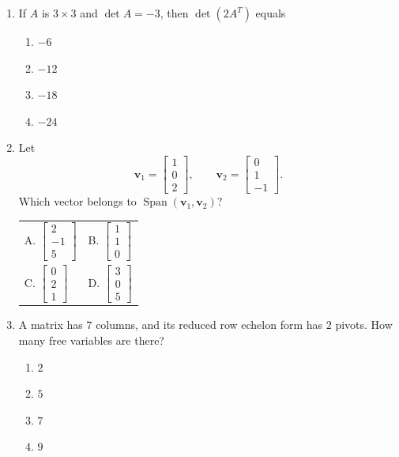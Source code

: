\documentclass[11pt]{article}
\newif\ifshowsolutions
\newcommand{\vect}[1]{\mathbf{#1}}
\newcommand{\mcneedspace}{\ifshowsolutions\Needspace{12\baselineskip}\fi}
\newcommand{\solution}[1]{%
  \ifshowsolutions
    \par\medskip
    {\color{solutionblue}\textbf{Solution.} #1}
    \par\medskip
  \fi}
\begin{document}
\begin{enumerate}
\mcneedspace
\item If $A$ is $3\times3$ and $\det A=-3$, then $\det(2A^T)$ equals
\begin{enumerate}[label=\Alph*.]
  \item $-6$
  \item $-12$
  \item $-18$
  \item $-24$
\end{enumerate}
\solution{\textbf{D.} $\det(2A^T)=2^3\det(A^T)=8\det A=-24$.}

\mcneedspace
\item Let
\[
\vect v_1=\begin{bmatrix}1\\0\\2\end{bmatrix},
\qquad
\vect v_2=\begin{bmatrix}0\\1\\-1\end{bmatrix}.
\]
Which vector belongs to $\operatorname{Span}(\vect v_1,\vect v_2)$?
\begin{center}
\begin{tabular}{@{}p{.45\linewidth}p{.45\linewidth}@{}}
A. $\begin{bmatrix}2\\-1\\5\end{bmatrix}$ &
B. $\begin{bmatrix}1\\1\\0\end{bmatrix}$ \\[1.5em]
C. $\begin{bmatrix}0\\2\\1\end{bmatrix}$ &
D. $\begin{bmatrix}3\\0\\5\end{bmatrix}$
\end{tabular}
\end{center}
\solution{\textbf{A.} The vector equals $2\vect v_1-\vect v_2$.}

\mcneedspace
\item A matrix has $7$ columns, and its reduced row echelon form has $2$ pivots. How many free variables are there?
\begin{enumerate}[label=\Alph*.]
  \item $2$
  \item $5$
  \item $7$
  \item $9$
\end{enumerate}
\solution{\textbf{B.} There are $7-2=5$ nonpivot columns, so there are five free variables.}


\end{enumerate}
\end{document}
